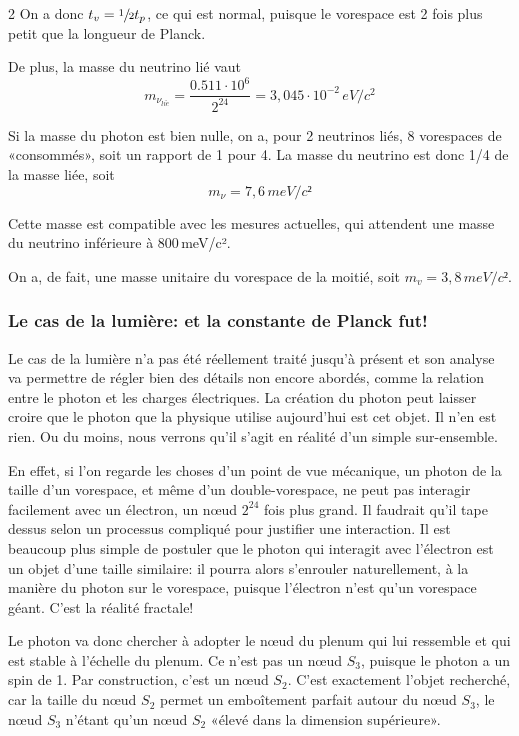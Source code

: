\begin{multicols}{2}
On a donc $t_v = \sfrac{1}{2}t_p$, ce qui est normal, puisque le vorespace est 2 fois plus petit que la
longueur de Planck.

De plus, la masse du neutrino lié vaut
\begin{equation*}
m_{\nu_{li\acute{e}}} = \frac {0.511 \cdot 10^6}{2^{24}} = 3,045 \cdot 10^{-2}\,eV/c^2
\end{equation*}

Si la masse du photon est bien nulle, on a, pour 2 neutrinos liés, 8
vorespaces de «consommés», soit un rapport de 1 pour 4. La masse du
neutrino est donc 1/4 de la masse liée, soit
\begin{equation*}
m_{\nu}= 7,6\,meV/c²
\end{equation*}

Cette masse est compatible avec les mesures actuelles, qui attendent
une masse du neutrino inférieure à 800\,meV/c².

On a, de fait, une masse unitaire du vorespace de la moitié, soit
$m_v = 3,8\,meV/c²$.

\subsubsection{Le cas de la lumière: et la constante de Planck fut!}

Le cas de la lumière n'a pas été réellement traité jusqu'à présent et
son analyse va permettre de régler bien des détails non encore abordés,
comme la relation entre le photon et les charges électriques. La
création du photon peut laisser croire que le photon que la physique
utilise aujourd'hui est cet objet. Il n'en est rien. Ou du moins, nous verrons qu'il s'agit en réalité d'un
simple sur-ensemble.

En effet, si l'on regarde les choses d'un point de vue mécanique, un
photon de la taille d'un vorespace, et même d'un double-vorespace, ne
peut pas interagir facilement avec un électron, un nœud $2^{24}$ fois plus
grand. Il faudrait qu'il tape dessus selon un processus compliqué pour
justifier une interaction. Il est beaucoup plus simple de
postuler que le photon qui interagit avec l'électron est un objet
d'une taille similaire: il pourra alors s'enrouler naturellement, à
la manière du photon sur le vorespace, puisque l'électron n'est qu'un
vorespace géant. C'est la réalité fractale!

Le photon va donc chercher à adopter le nœud du plenum qui lui
ressemble et qui est stable à l'échelle du plenum. Ce n'est pas un
nœud $S_3$, puisque le photon a un spin de 1. Par construction, c'est un
nœud $S_2$. C'est exactement l'objet recherché, car la taille du nœud
$S_2$ permet un emboîtement parfait autour du nœud $S_3$, le nœud $S_3$
n'étant qu'un nœud $S_2$ «élevé dans la dimension supérieure».


\end{multicols}
